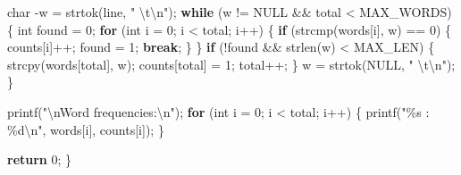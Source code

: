 \documentclass[
  letterpaper,
  DIV=11,
  numbers=noendperiod]{scrreprt}
\newenvironment{Shaded}{\begin{snugshade}}{\end{snugshade}}
\newcommand{\ControlFlowTok}[1]{\textcolor[rgb]{0.00,0.23,0.31}{\textbf{#1}}}
\newcommand{\DataTypeTok}[1]{\textcolor[rgb]{0.68,0.00,0.00}{#1}}
\newcommand{\DecValTok}[1]{\textcolor[rgb]{0.68,0.00,0.00}{#1}}
\newcommand{\NormalTok}[1]{\textcolor[rgb]{0.00,0.23,0.31}{#1}}
\newcommand{\OperatorTok}[1]{\textcolor[rgb]{0.37,0.37,0.37}{#1}}
\newcommand{\SpecialCharTok}[1]{\textcolor[rgb]{0.37,0.37,0.37}{#1}}
\newcommand{\StringTok}[1]{\textcolor[rgb]{0.13,0.47,0.30}{#1}}
\begin{document}
\begin{Shaded}
\begin{Highlighting}[]
    \DataTypeTok{char} \OperatorTok{{-}}\NormalTok{w }\OperatorTok{=}\NormalTok{ strtok}\OperatorTok{(}\NormalTok{line}\OperatorTok{,} \StringTok{" }\SpecialCharTok{\textbackslash{}t\textbackslash{}n}\StringTok{"}\OperatorTok{);}
    \ControlFlowTok{while} \OperatorTok{(}\NormalTok{w }\OperatorTok{!=}\NormalTok{ NULL }\OperatorTok{\&\&}\NormalTok{ total }\OperatorTok{\textless{}}\NormalTok{ MAX\_WORDS}\OperatorTok{)} \OperatorTok{\{}
        \DataTypeTok{int}\NormalTok{ found }\OperatorTok{=} \DecValTok{0}\OperatorTok{;}
        \ControlFlowTok{for} \OperatorTok{(}\DataTypeTok{int}\NormalTok{ i }\OperatorTok{=} \DecValTok{0}\OperatorTok{;}\NormalTok{ i }\OperatorTok{\textless{}}\NormalTok{ total}\OperatorTok{;}\NormalTok{ i}\OperatorTok{++)} \OperatorTok{\{}
            \ControlFlowTok{if} \OperatorTok{(}\NormalTok{strcmp}\OperatorTok{(}\NormalTok{words}\OperatorTok{[}\NormalTok{i}\OperatorTok{],}\NormalTok{ w}\OperatorTok{)} \OperatorTok{==} \DecValTok{0}\OperatorTok{)} \OperatorTok{\{}
\NormalTok{                counts}\OperatorTok{[}\NormalTok{i}\OperatorTok{]++;}
\NormalTok{                found }\OperatorTok{=} \DecValTok{1}\OperatorTok{;}
                \ControlFlowTok{break}\OperatorTok{;}
            \OperatorTok{\}}
        \OperatorTok{\}}
        \ControlFlowTok{if} \OperatorTok{(!}\NormalTok{found }\OperatorTok{\&\&}\NormalTok{ strlen}\OperatorTok{(}\NormalTok{w}\OperatorTok{)} \OperatorTok{\textless{}}\NormalTok{ MAX\_LEN}\OperatorTok{)} \OperatorTok{\{}
\NormalTok{            strcpy}\OperatorTok{(}\NormalTok{words}\OperatorTok{[}\NormalTok{total}\OperatorTok{],}\NormalTok{ w}\OperatorTok{);}
\NormalTok{            counts}\OperatorTok{[}\NormalTok{total}\OperatorTok{]} \OperatorTok{=} \DecValTok{1}\OperatorTok{;}
\NormalTok{            total}\OperatorTok{++;}
        \OperatorTok{\}}
\NormalTok{        w }\OperatorTok{=}\NormalTok{ strtok}\OperatorTok{(}\NormalTok{NULL}\OperatorTok{,} \StringTok{" }\SpecialCharTok{\textbackslash{}t\textbackslash{}n}\StringTok{"}\OperatorTok{);}
    \OperatorTok{\}}

\NormalTok{    printf}\OperatorTok{(}\StringTok{"}\SpecialCharTok{\textbackslash{}n}\StringTok{Word frequencies:}\SpecialCharTok{\textbackslash{}n}\StringTok{"}\OperatorTok{);}
    \ControlFlowTok{for} \OperatorTok{(}\DataTypeTok{int}\NormalTok{ i }\OperatorTok{=} \DecValTok{0}\OperatorTok{;}\NormalTok{ i }\OperatorTok{\textless{}}\NormalTok{ total}\OperatorTok{;}\NormalTok{ i}\OperatorTok{++)} \OperatorTok{\{}
\NormalTok{        printf}\OperatorTok{(}\StringTok{"}\SpecialCharTok{\%s}\StringTok{ : }\SpecialCharTok{\%d\textbackslash{}n}\StringTok{"}\OperatorTok{,}\NormalTok{ words}\OperatorTok{[}\NormalTok{i}\OperatorTok{],}\NormalTok{ counts}\OperatorTok{[}\NormalTok{i}\OperatorTok{]);}
    \OperatorTok{\}}

    \ControlFlowTok{return} \DecValTok{0}\OperatorTok{;}
\OperatorTok{\}}
\end{Highlighting}
\end{Shaded}
\end{document}
